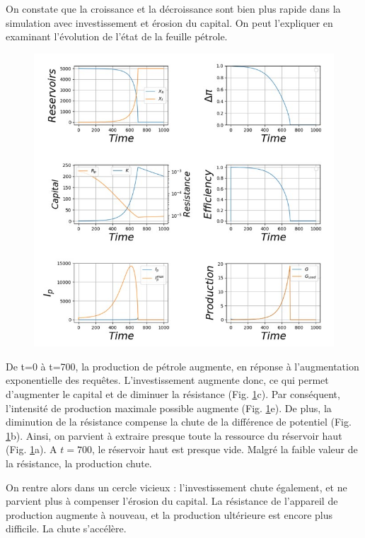 \documentclass[12pt,a4paper]{article}%
\begin{document}
On constate que la croissance et la décroissance sont bien plus rapide dans la
simulation avec investissement et érosion du capital. On peut l'expliquer en
examinant l'évolution de l'état de la feuille pétrole.

\begin{figure}[h]
\centering
\includegraphics[width=1.0\textwidth]{figures/Tableau-Bord14.jpg}\label{Fig14}\end{figure}

De t=0 à t=700, la production de pétrole augmente, en réponse à
l'augmentation exponentielle des requêtes. L'investissement augmente donc, ce
qui permet d'augmenter le capital et de diminuer la résistance (Fig.
\ref{Fig14}c). Par conséquent, l'intensité de production maximale possible
augmente (Fig. \ref{Fig14}e). De plus, la diminution de la résistance compense
la chute de la différence de potentiel (Fig. \ref{Fig14}b). Ainsi, on parvient
à extraire presque toute la ressource du réservoir haut (Fig.
\ref{Fig14}a). A $t=700$, le réservoir haut est presque vide. Malgré la faible
valeur de la résistance, la production chute.

On rentre alors dans un cercle vicieux : l'investissement chute également, et
ne parvient plus à compenser l'érosion du capital. La résistance de
l'appareil de production augmente à nouveau, et la production ultérieure
est encore plus difficile. La chute s'accélère.
\end{document}
